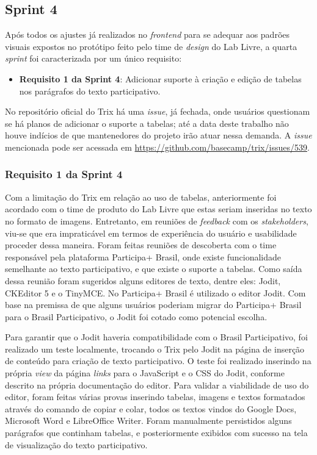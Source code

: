 \subsection {Sprint 4}

Após todos os ajustes já realizados no \textit{frontend} para se adequar aos padrões visuais expostos no protótipo feito pelo time de \textit{design} do Lab Livre, a quarta \textit{sprint} foi caracterizada por um único requisito:

\begin{itemize}
	\item \textbf{Requisito 1 da Sprint 4}: Adicionar suporte à criação e edição de tabelas nos parágrafos do texto participativo.
\end{itemize}

No repositório oficial do Trix há uma \textit{issue}, já fechada, onde usuários questionam se há planos de adicionar o suporte a tabelas; até a data deste trabalho não houve indícios de que mantenedores do projeto irão atuar nessa demanda.
A \textit{issue} mencionada pode ser acessada em \url{https://github.com/basecamp/trix/issues/539}.

\subsubsection {Requisito 1 da Sprint 4}

Com a limitação do Trix em relação ao uso de tabelas, anteriormente foi acordado com o time de produto do Lab Livre que estas seriam inseridas no texto no formato de imagens.
Entretanto, em reuniões de \textit{feedback} com os \textit{stakeholders}, viu-se que era impraticável em termos de experiência do usuário e usabilidade proceder dessa maneira.
Foram feitas reuniões de descoberta com o time responsável pela plataforma Participa+ Brasil, onde existe funcionalidade semelhante ao texto participativo, e que existe o suporte a tabelas.
Como saída dessa reunião foram sugeridos alguns editores de texto, dentre eles: Jodit, CKEditor 5 e o TinyMCE. No Participa+ Brasil é utilizado o editor Jodit.
Com base na premissa de que alguns usuários poderiam migrar do Participa+ Brasil para o Brasil Participativo, o Jodit foi cotado como potencial escolha.

Para garantir que o Jodit haveria compatibilidade com o Brasil Participativo, foi realizado um teste localmente, trocando o Trix pelo Jodit na página de inserção de conteúdo para criação de texto participativo.
O teste foi realizado inserindo na própria \textit{view} da página \textit{links} para o JavaScript e o CSS do Jodit, conforme descrito na própria documentação do editor.
Para validar a viabilidade de uso do editor, foram feitas várias provas inserindo tabelas, imagens e textos formatados através do comando de copiar e colar, todos os textos vindos do Google Docs, Microsoft Word e LibreOffice Writer.
Foram manualmente persistidos alguns parágrafos que continham tabelas, e posteriormente exibidos com sucesso na tela de visualização do texto participativo.

